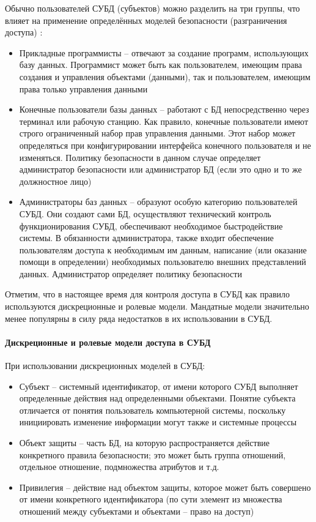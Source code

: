 Обычно пользователей СУБД (субъектов) можно разделить на три группы, что влияет на применение определённых 
моделей безопасности (разграничения доступа) \autocite{CitForumSafeDB}:
\begin{itemize}
    \item Прикладные программисты -- отвечают за создание программ, использующих базу данных. Программист 
    может быть как пользователем, имеющим права создания и управления объектами (данными), так и пользователем, 
    имеющим права только управления данными

    \item Конечные пользователи базы данных -- работают с БД непосредственно через терминал или рабочую станцию. 
    Как правило, конечные пользователи имеют строго ограниченный набор прав управления данными. Этот набор 
    может определяться при конфигурировании интерфейса конечного пользователя и не изменяться. Политику 
    безопасности в данном случае определяет администратор безопасности или администратор БД (если это одно и 
    то же должностное лицо)

    \item Администраторы баз данных -- образуют особую категорию пользователей СУБД. Они создают сами БД, 
    осуществляют технический контроль функционирования СУБД, обеспечивают необходимое быстродействие системы. 
    В обязанности администратора, также входит обеспечение пользователям доступа к необходимым им данным, 
    написание (или оказание помощи в определении) необходимых пользователю внешних представлений данных. 
    Администратор определяет политику безопасности
\end{itemize}

Отметим, что в настоящее время для контроля доступа в СУБД как правило используются дискреционные и ролевые 
модели. Мандатные модели значительно менее популярны в силу ряда недостатков в их использовании в СУБД.

\paragraph{Дискреционные и ролевые модели доступа в СУБД}

При использовании дискреционных моделей в СУБД:
\begin{itemize}
    \item Субъект -- системный идентификатор, от имени которого СУБД выполняет определенные действия над 
    определенными объектами. Понятие субъекта отличается от понятия пользователь компьютерной системы, 
    поскольку инициировать изменение информации могут также и системные процессы
    \item Объект защиты -- часть БД, на которую распространяется действие конкретного правила безопасности; 
    это может быть группа отношений, отдельное отношение, подмножества атрибутов и т.д.
    \item Привилегия -- действие над объектом защиты, которое может быть совершено от имени конкретного 
    идентификатора (по сути элемент из множества отношений между субъектами и объектами -- право на доступ)
\end{itemize}

